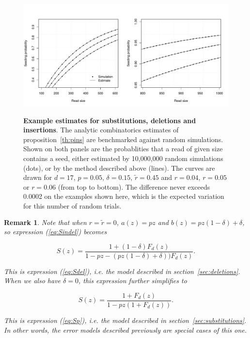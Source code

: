\documentclass{article}
\newtheorem{remark}{Remark}
\begin{document}
\begin{figure}[h]
\centering
\includegraphics[scale=0.445]{simulpins.pdf}
\label{fig:simulpins}
\caption{\textbf{Example estimates for substitutions, deletions and
insertions}. The analytic combinatorics estimates of
proposition~\ref{th:pins} are benchmarked against random simulations.
Shown on both panels are the probablities that a read of given size
contains a seed, either estimated by 10,000,000 random simulations (dots),
or by the method described above (lines). The curves are drawn for $d=17$,
$p=0.05$, $\delta=0.15$, $\tilde{r} = 0.45$ and $r=0.04$, $r=0.05$ or
$r=0.06$ (from top to bottom). The difference never exceeds 0.0002 on the
examples shown here, which is the expected variation for this number of
random trials.}
\end{figure}


\begin{remark}
Note that when $r = \tilde{r} = 0$, $a(z) = pz$ and $b(z) = pz(1-\delta) +
\delta$, so expression (\ref{eq:Sindel}) becomes

\begin{equation*}
S(z) = \frac{1 + (1-\delta)F_d(z)}{1-pz-(pz(1-\delta)+\delta))F_d(z)}.
\end{equation*}

This is expression (\ref{eq:Sdel}), \textit{i.e.} the model described in
section~\ref{sec:deletions}. When we also have $\delta = 0$, this
expression further simplifies to

\begin{equation*}
S(z) = \frac{1 + F_d(z)}{1-pz(1 + F_d(z))}.
\end{equation*}

This is expression (\ref{eq:Sp}), \textit{i.e.} the model described in
section~\ref{sec:substitutions}. In other words, the error models
described previously are special cases of this one.
\end{remark}
\end{document}
